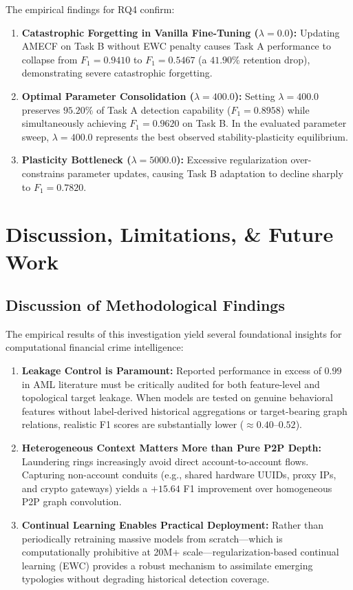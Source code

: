 \documentclass[conference]{IEEEtran}
\begin{document}
The empirical findings for RQ4 confirm:
\begin{enumerate}
    \item \textbf{Catastrophic Forgetting in Vanilla Fine-Tuning ($\lambda = 0.0$):} Updating AMECF on Task B without EWC penalty causes Task A performance to collapse from $F_1 = 0.9410$ to $F_1 = 0.5467$ (a $41.90\%$ retention drop), demonstrating severe catastrophic forgetting.
    \item \textbf{Optimal Parameter Consolidation ($\lambda = 400.0$):} Setting $\lambda = 400.0$ preserves $95.20\%$ of Task A detection capability ($F_1 = 0.8958$) while simultaneously achieving $F_1 = 0.9620$ on Task B. In the evaluated parameter sweep, $\lambda = 400.0$ represents the best observed stability-plasticity equilibrium.
    \item \textbf{Plasticity Bottleneck ($\lambda = 5000.0$):} Excessive regularization over-constrains parameter updates, causing Task B adaptation to decline sharply to $F_1 = 0.7820$.
\end{enumerate}

\section{Discussion, Limitations, \& Future Work}
\label{sec:discussion}

\subsection{Discussion of Methodological Findings}
The empirical results of this investigation yield several foundational insights for computational financial crime intelligence:
\begin{enumerate}
    \item \textbf{Leakage Control is Paramount:} Reported performance in excess of $0.99$ in AML literature must be critically audited for both feature-level and topological target leakage. When models are tested on genuine behavioral features without label-derived historical aggregations or target-bearing graph relations, realistic F1 scores are substantially lower ($\approx 0.40$--$0.52$).
    \item \textbf{Heterogeneous Context Matters More than Pure P2P Depth:} Laundering rings increasingly avoid direct account-to-account flows. Capturing non-account conduits (e.g., shared hardware UUIDs, proxy IPs, and crypto gateways) yields a $+15.64$ F1 improvement over homogeneous P2P graph convolution.
    \item \textbf{Continual Learning Enables Practical Deployment:} Rather than periodically retraining massive models from scratch---which is computationally prohibitive at 20M+ scale---regularization-based continual learning (EWC) provides a robust mechanism to assimilate emerging typologies without degrading historical detection coverage.
\end{enumerate}
\end{document}
